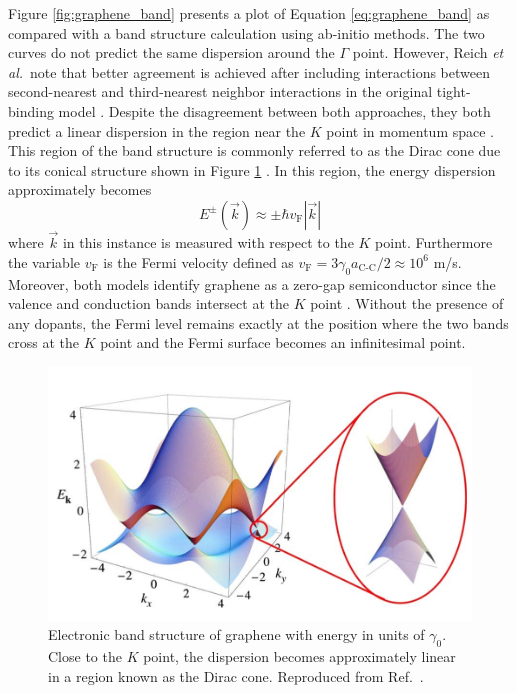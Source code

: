 Figure \ref{fig:graphene_band} presents a plot of Equation \eqref{eq:graphene_band} as compared with a band structure calculation using ab-initio methods. The two curves do not predict the same dispersion around the $\Gamma$ point. However, Reich \textit{et al.}\ note that better agreement is achieved after including interactions between second-nearest and third-nearest neighbor interactions in the original tight-binding model \cite{reich2002tight}. Despite the disagreement between both approaches, they both predict a linear dispersion in the region near the $K$ point in momentum space \cite{charlier2007electronic}. This region of the band structure is commonly referred to as the Dirac cone due to its conical structure shown in Figure \ref{fig:dirac_cone} \cite{charlier2007electronic}. In this region, the energy dispersion approximately becomes
\begin{equation}
	\displaystyle E^{\pm}(\vec{k}) \approx \pm \hbar v_\text{F}|\vec{k}|
\end{equation}
where $\vec{k}$ in this instance is measured with respect to the $K$ point. Furthermore the variable $v_\text{F}$ is the Fermi velocity defined as $v_\text{F} = 3 \gamma_0 a_\text{C-C}/2 \approx 10^6$ m/s. Moreover, both models identify graphene as a zero-gap semiconductor since the valence and conduction bands intersect at the $K$ point \cite{charlier2007electronic}. Without the presence of any dopants, the Fermi level remains exactly at the position where the two bands cross at the $K$ point and the Fermi surface becomes an infinitesimal point.

\begin{figure}[ht]
	\centering
	\includegraphics[scale=0.4]{images/chapter_optical_props/dirac_cone}
	\caption{Electronic band structure of graphene with energy in units of $\gamma_0$. Close to the $K$ point, the dispersion becomes approximately linear in a region known as the Dirac cone. Reproduced from Ref.\ \cite{neto2009electronic}.}
	\label{fig:dirac_cone}
\end{figure}



